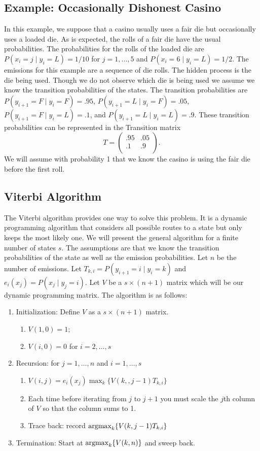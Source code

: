 \documentclass{article}
\numberwithin{equation}{section}
\newcommand{\argmax}{\operatornamewithlimits{argmax}}
\renewcommand{\P}{P}
\begin{document}
\subsection{Example: Occasionally Dishonest Casino}

In this example, we suppose that a casino usually uses a fair die
but occasionally uses a loaded die.  As is expected, the rolls of a
fair die have the usual probabilities.  The probabilities for the
rolls of the loaded die are $\P (x_i=j\mid y_i=L)=1/10$ for
$j=1,\ldots,5$ and $\P (x_i=6\mid y_i=L)=1/2$.  The emissions for
this example are a sequence of die rolls.  The hidden process is the
die being used. Though we do not observe which die is being used we
assume we know the transition probabilities of the states.  The
transition probabilities are $\P(y_{i+1}=F\mid y_i=F)=.95$,
$\P(y_{i+1}=L\mid y_i=F)=.05$, $\P(y_{i+1}=F\mid y_i=L)=.1$, and
$\P(y_{i+1}=L\mid y_i=L)=.9$. These transition probabilities can be
represented in the Transition matrix
\[
T=\left(
  \begin{array}{cc}
    .95 & .05 \\
    .1 & .9 \\
  \end{array}
\right).
\]
We will assume with probability 1 that we know the casino is using
the fair die before the first roll.

\subsection{Viterbi Algorithm}

The Viterbi algorithm provides one way to solve this problem.  It is
a dynamic programming algorithm that considers all possible routes
to a state but only keeps the most likely one.  We will present the
general algorithm for a finite number of states $s$.  The
assumptions are that we know the transition probabilities of the
state as well as the emission probabilities.  Let $n$ be the number
of emissions.  Let $T_{k,i}=\P(y_{i+1}=i\mid y_{i}=k)$ and
$e_i(x_j)=\P(x_j\mid y_j=i)$.  Let $V$ be a $s\times (n+1)$ matrix
which will be our dynamic programming matrix.  The algorithm is as
follows:
\begin{enumerate}
\item Initialization: Define $V$ as a $s\times (n+1)$ matrix.
\begin{enumerate}
\item $V(1,0)=1$;
\item $V(i,0)=0$ for $i=2,\ldots,s$
\end{enumerate}
\item Recursion: for $j=1,\ldots,n$ and $i=1,\ldots,s$
\begin{enumerate}
\item $V(i,j)=e_i(x_j)\max_k \{V(k,,j-1)T_{k,i}\}$
\item Each time before iterating from $j$ to $j+1$ you must scale the $j$th
column of $V$ so that the column sums to 1.
\item Trace back: record $\argmax_k\{V(k,j-1)T_{k,i}\}$
\end{enumerate}
\item Termination: Start at $\argmax_k\{V(k,n)\}$ and sweep back.
\end{enumerate}
\end{document}
